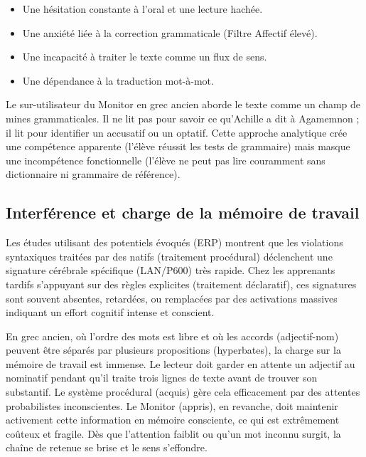 \begin{itemize}\item Une hésitation constante à l'oral et une lecture hachée.\item Une anxiété liée à la correction grammaticale (Filtre Affectif élevé).\item Une incapacité à traiter le texte comme un flux de sens.\item Une dépendance à la traduction mot-à-mot.\end{itemize}Le sur-utilisateur du Monitor en grec ancien aborde le texte comme un champ de mines grammaticales.
Il ne lit pas pour savoir ce qu'Achille a dit à Agamemnon ; il lit pour identifier un accusatif ou
un optatif. Cette approche analytique crée une \og compétence apparente\fg{} (l'élève réussit les
tests de grammaire) mais masque une incompétence fonctionnelle (l'élève ne peut pas lire couramment
sans dictionnaire ni grammaire de référence).\cite{II-2-3-ref28}



\subsection{Interférence et charge de la mémoire de travail}

Les études utilisant des potentiels évoqués (ERP) montrent que les violations syntaxiques traitées
par des natifs (traitement procédural) déclenchent une signature cérébrale spécifique (LAN/P600)
très rapide. Chez les apprenants tardifs s'appuyant sur des règles explicites (traitement
déclaratif), ces signatures sont souvent absentes, retardées, ou remplacées par des activations
massives indiquant un effort cognitif intense et conscient.\cite{II-2-3-ref29}

En grec ancien, où l'ordre des mots est libre et où les accords (adjectif-nom) peuvent être séparés
par plusieurs propositions (hyperbates), la charge sur la mémoire de travail est immense. Le lecteur
doit \og garder en attente\fg{} un adjectif au nominatif pendant qu'il traite trois lignes de texte
avant de trouver son substantif. Le système procédural (acquis) gère cela efficacement par des
attentes probabilistes inconscientes. Le Monitor (appris), en revanche, doit maintenir activement
cette information en mémoire consciente, ce qui est extrêmement coûteux et fragile. Dès que
l'attention faiblit ou qu'un mot inconnu surgit, la chaîne de retenue se brise et le sens
s'effondre.\cite{II-2-3-ref31}



